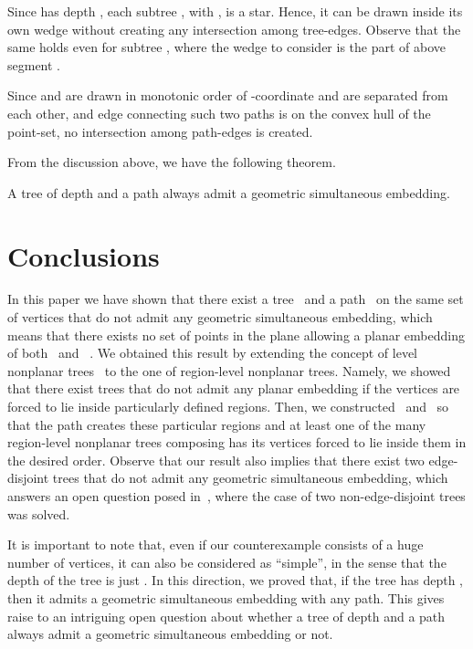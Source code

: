 \documentclass[a4paper,10pt]{llncs}
\newcommand{\T}{\mbox{ }}
\renewcommand{\P}{\mbox{ }}
\begin{document}
Since  has depth , each subtree , with , is a star. Hence, it can be drawn inside its own wedge  without creating any intersection among tree-edges. Observe that the same holds even for subtree , where the wedge to consider is the part of  above segment .

Since  and  are drawn in monotonic order of -coordinate and are separated from each other, and edge  connecting such two paths is on the convex hull of the point-set, no intersection among path-edges is created.

From the discussion above, we have the following theorem.

\begin{theorem}\label{th:depth2}
A tree of depth  and a path always admit a geometric simultaneous embedding.
\end{theorem}

\section{Conclusions}\label{se:conclusions}

In this paper we have shown that there exist a tree \T and a path \P on the same set of vertices that do not admit any geometric simultaneous embedding, which means that there exists no set of points in the plane allowing a planar embedding of both \T and \P. We obtained this result by extending the concept of level nonplanar trees~\cite{fk-mlnpt-07} to the one of region-level nonplanar trees. Namely, we showed that there exist trees that do not admit any planar embedding if the vertices are forced to lie inside particularly defined regions. Then, we constructed \T and \P so that the path creates these particular regions and at least one of the many region-level nonplanar trees composing  has its vertices forced to lie inside them in the desired order. Observe that our result also implies that there exist two edge-disjoint trees that do not admit any geometric simultaneous embedding, which answers an open question posed in~\cite{gkv-ttsids-09}, where the case of two non-edge-disjoint trees was solved.

It is important to note that, even if our counterexample consists of a huge number of vertices, it can also be considered as ``simple'', in the sense that the depth of the tree is just . In this direction, we proved that, if the tree has depth , then it admits a geometric simultaneous embedding with any path. This gives raise to an intriguing open question about whether a tree of depth  and a path always admit a geometric simultaneous embedding or not.



\end{document}

